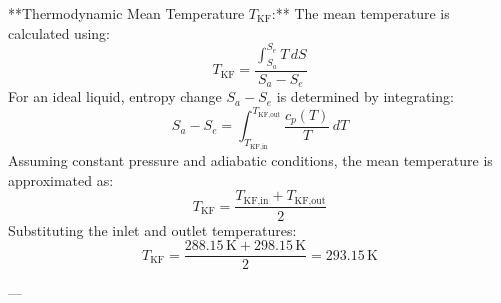 **Thermodynamic Mean Temperature \( T_{\text{KF}} \):**  
The mean temperature is calculated using:  
\[
T_{\text{KF}} = \frac{\int_{S_a}^{S_e} T \, dS}{S_a - S_e}
\]  
For an ideal liquid, entropy change \( S_a - S_e \) is determined by integrating:  
\[
S_a - S_e = \int_{T_{\text{KF,in}}}^{T_{\text{KF,out}}} \frac{c_p(T)}{T} \, dT
\]  
Assuming constant pressure and adiabatic conditions, the mean temperature is approximated as:  
\[
T_{\text{KF}} = \frac{T_{\text{KF,in}} + T_{\text{KF,out}}}{2}
\]  
Substituting the inlet and outlet temperatures:  
\[
T_{\text{KF}} = \frac{288.15 \, \text{K} + 298.15 \, \text{K}}{2} = 293.15 \, \text{K}
\]  

---